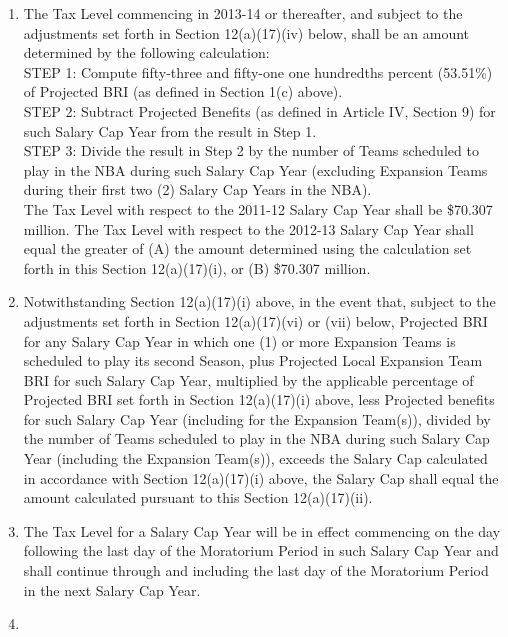 \documentclass[
]{book}
\providecommand{\tightlist}{%
  \setlength{\itemsep}{0pt}\setlength{\parskip}{0pt}}
\begin{document}
\begin{enumerate}
\begin{enumerate}
    \begin{enumerate}
    \def\labelenumiii{(\roman{enumiii})}
    \tightlist
    \item
      The Tax Level commencing in 2013-14 or thereafter, and subject to the adjustments set forth in Section 12(a)(17)(iv) below, shall be an amount determined by the following calculation:\\
      STEP 1: Compute fifty-three and fifty-one one hundredths percent (53.51\%) of Projected BRI (as defined in Section 1(c) above).\\
      STEP 2: Subtract Projected Benefits (as defined in Article IV, Section 9) for such Salary Cap Year from the result in Step 1.\\
      STEP 3: Divide the result in Step 2 by the number of Teams scheduled to play in the NBA during such Salary Cap Year (excluding Expansion Teams during their first two (2) Salary Cap Years in the NBA).\\
      The Tax Level with respect to the 2011-12 Salary Cap Year shall be \$70.307 million. The Tax Level with respect to the 2012-13 Salary Cap Year shall equal the greater of (A) the amount determined using the calculation set forth in this Section 12(a)(17)(i), or (B) \$70.307 million.\\
    \item
      Notwithstanding Section 12(a)(17)(i) above, in the event that, subject to the adjustments set forth in Section 12(a)(17)(vi) or (vii) below, Projected BRI for any Salary Cap Year in which one (1) or more Expansion Teams is scheduled to play its second Season, plus Projected Local Expansion Team BRI for such Salary Cap Year, multiplied by the applicable percentage of Projected BRI set forth in Section 12(a)(17)(i) above, less Projected benefits for such Salary Cap Year (including for the Expansion Team(s)), divided by the number of Teams scheduled to play in the NBA during such Salary Cap Year (including the Expansion Team(s)), exceeds the Salary Cap calculated in accordance with Section 12(a)(17)(i) above, the Salary Cap shall equal the amount calculated pursuant to this Section 12(a)(17)(ii).
    \item
      The Tax Level for a Salary Cap Year will be in effect commencing on the day following the last day of the Moratorium Period in such Salary Cap Year and shall continue through and including the last day of the Moratorium Period in the next Salary Cap Year.
    \item

\end{enumerate}
\end{enumerate}
\end{enumerate}
\end{document}
